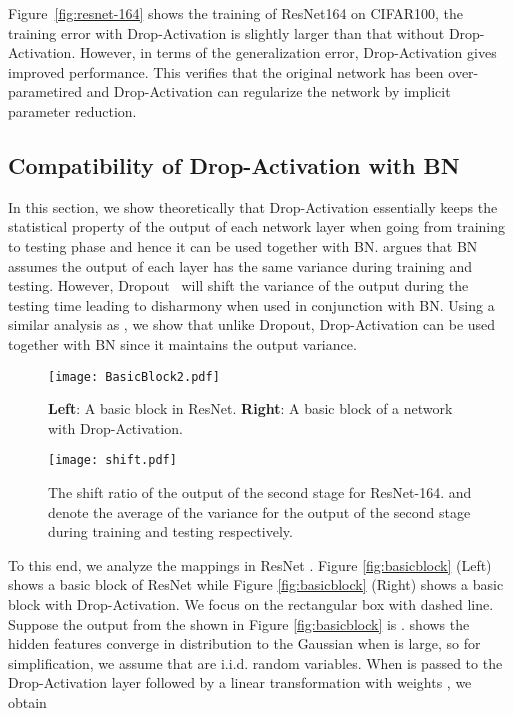 \documentclass[11pt]{article}
\begin{document}
Figure~\ref{fig:resnet-164} shows the training of ResNet164 on CIFAR100, the training error with Drop-Activation is slightly larger than that without Drop-Activation. However, in terms of the generalization error, Drop-Activation gives improved performance. This verifies that the original network has been over-parametired and Drop-Activation can regularize the network by implicit parameter reduction.

\subsection{Compatibility of Drop-Activation with BN}
\label{subsec:harmony}
In this section, we show theoretically that Drop-Activation essentially keeps the statistical property of the output of each network layer when going from training to testing phase and hence it can be used together with BN. \cite{BNandDropout} argues that BN assumes the output of each layer has the same variance during training and testing. However, Dropout~\cite{dropout} will shift the variance of the output during the testing time leading to disharmony when used in conjunction with BN. Using a similar analysis as \cite{BNandDropout}, we show that unlike Dropout, Drop-Activation can be used together with BN since it maintains the output variance.

\begin{figure}[ht]
\centering
\begin{minipage}[t]{0.4\textwidth}
\vspace{0pt}
\texttt{[image: BasicBlock2.pdf]}
\caption{\textbf{Left}: A basic block in ResNet. \textbf{Right}: A basic block of a network with Drop-Activation. }
\label{fig:basicblock}
\end{minipage}
\hspace{.3in}
\begin{minipage}[t]{0.4\textwidth}
\vspace{0pt}
\texttt{[image: shift.pdf]}
\caption{The shift ratio of the output of the second stage for ResNet-164.
   and  denote the average of the variance for the output of the second stage during training and testing respectively.}
\label{fig:var_shift}
\end{minipage}
\vspace{-0.4cm}
\end{figure}

To this end, we analyze the mappings in ResNet \cite{resnet}. Figure \ref{fig:basicblock} (Left) shows a basic block of ResNet while Figure \ref{fig:basicblock} (Right) shows a basic block with Drop-Activation. We focus on the rectangular box with dashed line. Suppose the output from the  shown in Figure \ref{fig:basicblock} is . \cite{lee2019wide} shows the hidden features converge in distribution to the Gaussian when  is large, so for simplification, we assume that  are i.i.d. random variables. When  is passed to the Drop-Activation layer followed by a linear transformation  with weights , we obtain
\end{document}
